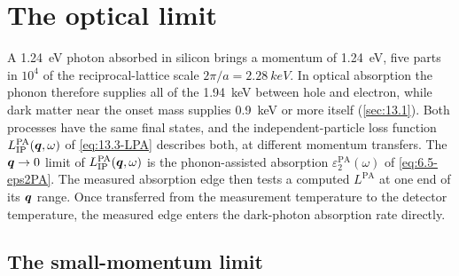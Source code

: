 \section{The optical limit}\label{sec:13.5}

A \SI{1.24}{eV} photon absorbed in silicon brings a momentum of \SI{1.24}{eV}, five parts in $10^4$ of the reciprocal-lattice scale $2\pi/a = \SI{2.28}{keV}$. In optical absorption the phonon therefore supplies all of the \SI{1.94}{keV} between hole and electron, while dark matter near the onset mass supplies \SI{0.9}{keV} or more itself (\cref{sec:13.1}). Both processes have the same final states, and the independent-particle loss function $L^{\mathrm{PA}}_{\mathrm{IP}}(\bm{q},\omega)$ of \cref{eq:13.3-LPA} describes both, at different momentum transfers. The $\bm{q}\to0$ limit of $L^{\mathrm{PA}}_{\mathrm{IP}}(\bm{q},\omega)$ is the phonon-assisted absorption $\varepsilon_2^{\mathrm{PA}}(\omega)$ of \cref{eq:6.5-eps2PA}. The measured absorption edge then tests a computed $L^{\mathrm{PA}}$ at one end of its $\bm{q}$ range. Once transferred from the measurement temperature to the detector temperature, the measured edge enters the dark-photon absorption rate directly.

\subsection{The small-momentum limit}

